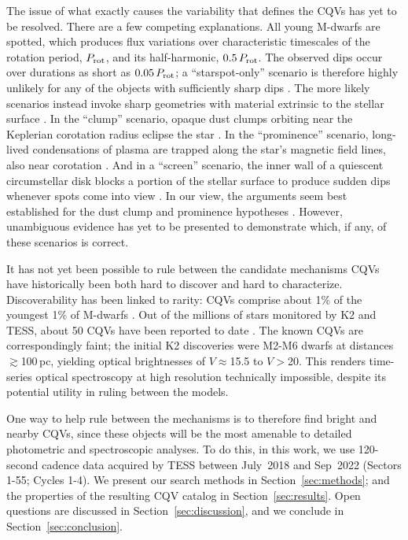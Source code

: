 \documentclass[11pt,twocolumn,tighten]{aastex63}
\begin{document}
The issue of what exactly causes the variability that defines the CQVs
has yet to be resolved.  There are a few competing explanations.  All
young M-dwarfs are spotted, which produces flux variations over
characteristic timescales of the rotation period, $P_{\rm rot}$, and
its half-harmonic, $0.5\,P_{\rm rot}$.  The observed dips occur over
durations as short as $0.05\,P_{\rm rot}$; a ``starspot-only''
scenario is therefore highly unlikely for any of the objects with
sufficiently sharp dips
\citep{2017AJ....153..152S,2021MNRAS.500.1366K}.   The more likely
scenarios instead invoke sharp geometries with material extrinsic to
the stellar surface \citep[see
Refs.~][]{2017AJ....153..152S,2022AJ....163..144G}.  In the ``clump''
scenario, opaque dust clumps orbiting near the Keplerian corotation
radius eclipse the star
\citep{2017AJ....153..152S,2023MNRAS.518.4734S}.  In the
``prominence'' scenario, long-lived condensations of plasma are
trapped along the star’s magnetic field lines, also near corotation
\citep{2022MNRAS.514.5465W}.  And in a ``screen'' scenario, the inner
wall of a quiescent circumstellar disk blocks a portion of the stellar
surface to produce sudden dips whenever spots come into view
\citep{2019ApJ...876..127Z}.  In our view, the arguments seem best
established for the dust clump and prominence hypotheses
\citep{2023MNRAS.518.4734S,2022MNRAS.514.5465W}.  However, unambiguous
evidence has yet to be presented to demonstrate which, if any, of
these scenarios is correct.

It has not yet been possible to rule between the candidate mechanisms
CQVs have historically been both hard to discover and hard to
characterize.   Discoverability has been linked to rarity: CQVs
comprise about 1\% of the youngest 1\% of M-dwarfs
\citep{2018AJ....155..196R}.  Out of the millions of stars monitored
by K2 and TESS, about 50 CQVs have been reported to date
\citep{2017AJ....153..152S,2018AJ....155...63S,2019ApJ...876..127Z,2022AJ....163..144G,2023ApJ...945..114P}.
The known CQVs are correspondingly faint; the initial K2 discoveries
\citep{2017AJ....153..152S} were M2-M6 dwarfs at distances
$\gtrsim$100\,pc, yielding optical brightnesses of $V$$\approx$15.5 to
$V$$>$20.  This renders time-series optical spectroscopy at high
resolution technically impossible, despite its potential utility in
ruling between the models.

One way to help rule between the mechanisms is to therefore find
bright and nearby CQVs, since these objects will be the most amenable
to detailed photometric and spectroscopic analyses.  To do this, in
this work, we use 120-second cadence data acquired by TESS between
July~2018 and Sep~2022 (Sectors 1-55; Cycles 1-4).  We present our
search methods in Section~\ref{sec:methods}; and the properties of the
resulting CQV catalog in Section~\ref{sec:results}.  Open questions
are discussed in Section~\ref{sec:discussion}, and we conclude in
Section~\ref{sec:conclusion}.
\end{document}
